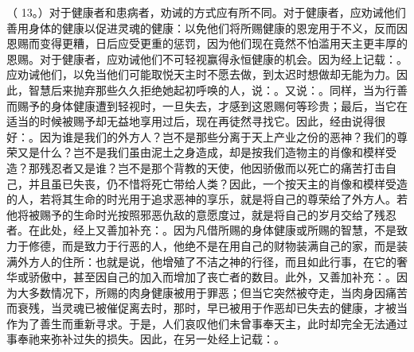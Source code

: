 （ 13。）对于健康者和患病者，劝诫的方式应有所不同。对于健康者，应劝诫他们善用身体的健康以促进灵魂的健康：以免他们将所赐健康的恩宠用于不义，反而因恩赐而变得更糟，日后应受更重的惩罚，因为他们现在竟然不怕滥用天主更丰厚的恩赐。对于健康者，应劝诫他们不可轻视赢得永恒健康的机会。因为经上记载：。应劝诫他们，以免当他们可能取悦天主时不愿去做，到太迟时想做却无能为力。因此，智慧后来抛弃那些久久拒绝她起初呼唤的人，说：。又说：。同样，当为行善而赐予的身体健康遭到轻视时，一旦失去，才感到这恩赐何等珍贵；最后，当它在适当的时候被赐予却无益地享用过后，现在再徒然寻找它。因此，经由说得很好：。因为谁是我们的外方人？岂不是那些分离于天上产业之份的恶神？我们的尊荣又是什么？岂不是我们虽由泥土之身造成，却是按我们造物主的肖像和模样受造？那残忍者又是谁？岂不是那个背教的天使，他因骄傲而以死亡的痛苦打击自己，并且虽已失丧，仍不惜将死亡带给人类？因此，一个按天主的肖像和模样受造的人，若将其生命的时光用于追求恶神的享乐，就是将自己的尊荣给了外方人。若他将被赐予的生命时光按照邪恶仇敌的意愿度过，就是将自己的岁月交给了残忍者。在此处，经上又善加补充：。因为凡借所赐的身体健康或所赐的智慧，不是致力于修德，而是致力于行恶的人，他绝不是在用自己的财物装满自己的家，而是装满外方人的住所：也就是说，他增殖了不洁之神的行径，而且如此行事，在它的奢华或骄傲中，甚至因自己的加入而增加了丧亡者的数目。此外，又善加补充：。因为大多数情况下，所赐的肉身健康被用于罪恶；但当它突然被夺走，当肉身因痛苦而衰残，当灵魂已被催促离去时，那时，早已被用于作恶却已失去的健康，才被当作为了善生而重新寻求。于是，人们哀叹他们未曾事奉天主，此时却完全无法通过事奉祂来弥补过失的损失。因此，在另一处经上记载：。\par

